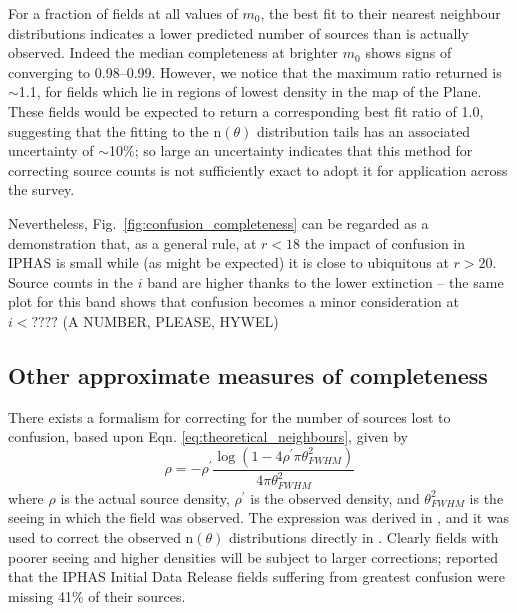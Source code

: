 \documentclass[a4paper,useAMS,usenatbib]{mn2e}
\begin{document}
For a fraction of fields at all values of $m_0$, the best fit to their nearest
neighbour distributions indicates a lower predicted number of sources than
is actually observed. Indeed the median completeness at brighter $m_0$ shows signs of
converging to 0.98--0.99. However, we notice that the maximum ratio returned is $\sim$1.1, 
for fields which lie in regions of lowest density in the map of the Plane. These fields 
would be expected to return a corresponding best fit ratio of 1.0, suggesting that the 
fitting to the n$(\theta)$ distribution tails has an associated uncertainty of $\sim$10\%; 
so large an uncertainty indicates that this method for correcting source counts is not 
sufficiently exact to adopt it for application across the survey.  

Nevertheless, Fig.~\ref{fig:confusion_completeness} can be regarded as a demonstration that, 
as a general rule, at $r < 18$ the impact of confusion in IPHAS is small while (as might be 
expected) it is close to ubiquitous at $r > 20$.  Source counts in the $i$ band are 
higher thanks to the lower extinction -- the same plot for this band shows that 
confusion becomes a minor consideration at $i < ????$ (A NUMBER, PLEASE, HYWEL)

\subsection{Other approximate measures of completeness}
\label{subsec:turnovers} 


There exists a formalism for correcting for the number of sources lost to 
confusion, based upon Eqn. \ref{eq:theoretical_neighbours}, given by
\begin{equation}
\rho = - \rho^{\prime}\frac{\log\left(1-4\rho^{\prime}\pi\theta_{FWHM}^2\right)}{4\pi\theta_{FWHM}^2}
\label{eq:irwin_confusion}
\end{equation}
\noindent where $\rho$ is the actual source density, $\rho^{\prime}$ is the observed density, and $\theta_{FWHM}^2$ 
is the seeing in which the field was observed. The expression was derived in \cite{Irwin1984}, and it was used to correct 
the observed n$(\theta)$ distributions directly in \citet{Gonzalez-Solares2008}. Clearly fields with poorer seeing and 
higher densities will be subject to larger corrections; \citep{Gonzalez-Solares2008} reported that the IPHAS 
Initial Data Release fields suffering from greatest confusion were missing 41\% of their sources.
\end{document}
